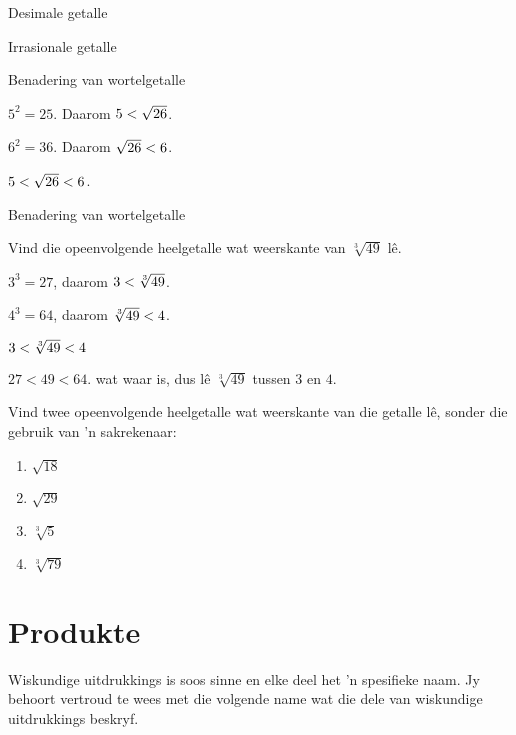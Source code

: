 \begin{Aktiwiteit}{Desimale getalle}
\begin{aktiwiteit}{Irrasionale getalle}
\begin{wex}{Benadering van wortelgetalle}
{     
${5}^{2}=25$. Daarom $5<{}\sqrt{26}$.

${6}^{2}=36$. 
Daarom $\sqrt{26}<{}6$.

$5<{}\sqrt{26}<{}6$. 
}
\end{wex}


\begin{wex}{Benadering van wortelgetalle }{

Vind die opeenvolgende heelgetalle wat weerskante van $\sqrt[3]{49}$ lê.
}
{
   ${3}^{3}=27$, daarom $3<{}\sqrt[3]{49}$.

 ${4}^{3}=64$, daarom $\sqrt[3]{49}<{}4$. 

$3<{}\sqrt[3]{49}<{}4$

$27<49<64$. wat waar is, dus lê $\sqrt[3]{49}$ tussen $3$ en $4$.
}
\end{wex}

\begin{exercises}{}
 {
Vind twee opeenvolgende heelgetalle wat weerskante van die getalle lê, sonder die gebruik van 'n sakrekenaar:
\begin{enumerate}[itemsep=5pt, label=\textbf{\arabic*}. ]
\item $\sqrt{18}$
\item $\sqrt{29}$
\item $\sqrt[3]{5}$
\item $\sqrt[3]{79}$

\end{enumerate}
}
\end{exercises}



\section{Produkte}
\setcounter{figure}{1}
\setcounter{subfigure}{1}

%   
\nopagebreak
Wiskundige uitdrukkings is soos sinne en elke deel het ’n spesifieke naam. Jy behoort vertroud te wees met die
volgende name wat die dele van wiskundige uitdrukkings beskryf.\par 


\end{aktiwiteit}
\end{Aktiwiteit}

